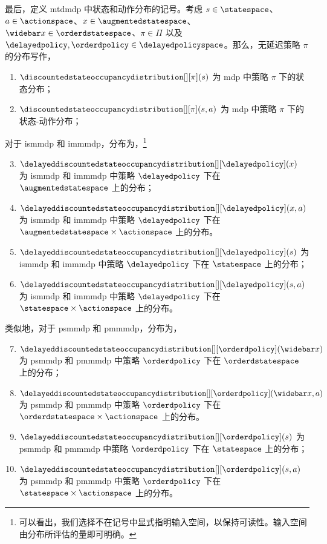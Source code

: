 最后，定义 \gls{mtdmdp} 中状态和动作分布的记号。考虑 $s\in\statespace$、$a\in\actionspace$、$x\in\augmentedstatespace$、$\widebar x\in\orderdstatespace$、$\pi\in\Pi$ 以及 $\delayedpolicy,\orderdpolicy\in\delayedpolicyspace$。那么，无延迟策略 $\pi$ 的分布写作，
\begin{enumerate}
    \item $\discountedstateoccupancydistribution[][\pi](s)$ 为 \gls{mdp} 中策略 $\pi$ 下的状态分布；
    \item $\discountedstateoccupancydistribution[][\pi](s,a)$ 为 \gls{mdp} 中策略 $\pi$ 下的状态-动作分布；
\end{enumerate}
对于 \gls{ismmdp} 和 \gls{immmdp}，分布为，\footnote{可以看出，我们选择不在记号中显式指明输入空间，以保持可读性。输入空间由分布所评估的量即可明确。}
\begin{enumerate}
\setcounter{enumi}{2}
    \item $\delayeddiscountedstateoccupancydistribution[][\delayedpolicy](x)$ 为 \gls{ismmdp} 和 \gls{immmdp} 中策略 $\delayedpolicy$ 下在 $\augmentedstatespace$ 上的分布；
    \item $\delayeddiscountedstateoccupancydistribution[][\delayedpolicy](x,a)$ 为 \gls{ismmdp} 和 \gls{immmdp} 中策略 $\delayedpolicy$ 下在 $\augmentedstatespace\times\actionspace$ 上的分布。
    \item $\delayeddiscountedstateoccupancydistribution[][\delayedpolicy](s)$ 为 \gls{ismmdp} 和 \gls{immmdp} 中策略 $\delayedpolicy$ 下在 $\statespace$ 上的分布；
    \item $\delayeddiscountedstateoccupancydistribution[][\delayedpolicy](s,a)$ 为 \gls{ismmdp} 和 \gls{immmdp} 中策略 $\delayedpolicy$ 下在 $\statespace\times\actionspace$ 上的分布。
\end{enumerate}
类似地，对于 \gls{psmmdp} 和 \gls{pmmmdp}，分布为，
\begin{enumerate}
\setcounter{enumi}{6}
    \item $\delayeddiscountedstateoccupancydistribution[][\orderdpolicy](\widebar x)$ 为 \gls{psmmdp} 和 \gls{pmmmdp} 中策略 $\orderdpolicy$ 下在 $\orderdstatespace$ 上的分布；
    \item $\delayeddiscountedstateoccupancydistribution[][\orderdpolicy](\widebar x,a)$ 为 \gls{psmmdp} 和 \gls{pmmmdp} 中策略 $\orderdpolicy$ 下在 $\orderdstatespace\times\actionspace$ 上的分布。
    \item $\delayeddiscountedstateoccupancydistribution[][\orderdpolicy](s)$ 为 \gls{psmmdp} 和 \gls{pmmmdp} 中策略 $\orderdpolicy$ 下在 $\statespace$ 上的分布；
    \item $\delayeddiscountedstateoccupancydistribution[][\orderdpolicy](s,a)$ 为 \gls{psmmdp} 和 \gls{pmmmdp} 中策略 $\orderdpolicy$ 下在 $\statespace\times\actionspace$ 上的分布。
\end{enumerate}